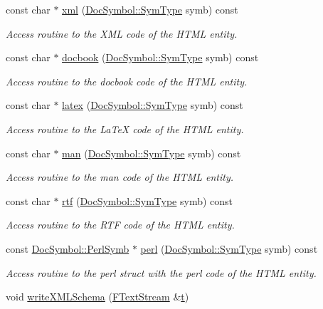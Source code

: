 \begin{DoxyCompactItemize}
const char $\ast$ \hyperlink{class_html_entity_mapper_abc6b60d7d8e1f889ebd7c22c56b6f801}{xml} (\hyperlink{class_doc_symbol_abea9ba345564542cc6b65ae4c76be6c2}{Doc\+Symbol\+::\+Sym\+Type} symb) const 
\begin{DoxyCompactList}\small\item\em Access routine to the X\+M\+L code of the H\+T\+M\+L entity. \end{DoxyCompactList}\item 
const char $\ast$ \hyperlink{class_html_entity_mapper_a9e1b84fe6b05bb22a2de46a312f25692}{docbook} (\hyperlink{class_doc_symbol_abea9ba345564542cc6b65ae4c76be6c2}{Doc\+Symbol\+::\+Sym\+Type} symb) const 
\begin{DoxyCompactList}\small\item\em Access routine to the docbook code of the H\+T\+M\+L entity. \end{DoxyCompactList}\item 
const char $\ast$ \hyperlink{class_html_entity_mapper_adf5d438d76175bf69b8b3f5f5cf48049}{latex} (\hyperlink{class_doc_symbol_abea9ba345564542cc6b65ae4c76be6c2}{Doc\+Symbol\+::\+Sym\+Type} symb) const 
\begin{DoxyCompactList}\small\item\em Access routine to the La\+Te\+X code of the H\+T\+M\+L entity. \end{DoxyCompactList}\item 
const char $\ast$ \hyperlink{class_html_entity_mapper_ad37ccaeb13f37df8a8822dd34a0f72ac}{man} (\hyperlink{class_doc_symbol_abea9ba345564542cc6b65ae4c76be6c2}{Doc\+Symbol\+::\+Sym\+Type} symb) const 
\begin{DoxyCompactList}\small\item\em Access routine to the man code of the H\+T\+M\+L entity. \end{DoxyCompactList}\item 
const char $\ast$ \hyperlink{class_html_entity_mapper_aa3649e98f6a2eb010fe066f28f41bfe0}{rtf} (\hyperlink{class_doc_symbol_abea9ba345564542cc6b65ae4c76be6c2}{Doc\+Symbol\+::\+Sym\+Type} symb) const 
\begin{DoxyCompactList}\small\item\em Access routine to the R\+T\+F code of the H\+T\+M\+L entity. \end{DoxyCompactList}\item 
const \hyperlink{struct_doc_symbol_1_1_perl_symb}{Doc\+Symbol\+::\+Perl\+Symb} $\ast$ \hyperlink{class_html_entity_mapper_a6904c7bc4187272ab3b8de3887015901}{perl} (\hyperlink{class_doc_symbol_abea9ba345564542cc6b65ae4c76be6c2}{Doc\+Symbol\+::\+Sym\+Type} symb) const 
\begin{DoxyCompactList}\small\item\em Access routine to the perl struct with the perl code of the H\+T\+M\+L entity. \end{DoxyCompactList}\item 
void \hyperlink{class_html_entity_mapper_a8aacc9cd8ba8159378ad2f143058ae49}{write\+X\+M\+L\+Schema} (\hyperlink{class_f_text_stream}{F\+Text\+Stream} \&\hyperlink{058__bracket__recursion_8tcl_a69e959f6901827e4d8271aeaa5fba0fc}{t})
\end{DoxyCompactItemize}
